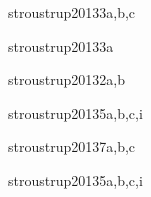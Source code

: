 \begin{syllabus}
\begin{unit}{\ALBasicAnalysisDef}{stroustrup2013}{3}{a,b,c}
   \begin{topics}
      \item \ALBasicAnalysisTopicAsymptotic
      \item \ALBasicAnalysisTopicIdentifying
   \end{topics}
   \begin{learningoutcomes}
      \item \ALBasicAnalysisObjTHREE
   \end{learningoutcomes}
\end{unit}

\begin{unit}{\ALFundamentalAlgorithmsDef}{stroustrup2013}{3}{a}
    \ALFundamentalAlgorithmsAllTopics
    \ALFundamentalAlgorithmsAllObjectives
\end{unit}

\begin{unit}{\PLDeclarationsAndTypesDef}{stroustrup2013}{2}{a,b}
    \PLDeclarationsAndTypesAllTopics
    \PLDeclarationsAndTypesAllObjectives
\end{unit}

\begin{unit}{\PLAbstractionMechanismsDef}{stroustrup2013}{5}{a,b,c,i}
    \PLAbstractionMechanismsAllTopics
    \PLAbstractionMechanismsAllTopics
\end{unit}

\begin{unit}{\PLObjectOrientedProgrammingDef}{stroustrup2013}{7}{a,b,c}
    \PLObjectOrientedProgrammingAllTopics
    \PLObjectOrientedProgrammingAllObjectives
\end{unit}

\begin{unit}{\SESoftwareDesignDef}{stroustrup2013}{5}{a,b,c,i}
   \begin{topics}
	\item \SESoftwareDesignTopicFundamental%
	\item \SESoftwareDesignTopicTherole%
	\item \SESoftwareDesignTopicDesignPatterns%
   \end{topics}
   \begin{learningoutcomes}
      \item \SESoftwareDesignObjONE
      \item \SESoftwareDesignObjFIVE
   \end{learningoutcomes}
\end{unit}


\end{syllabus}
